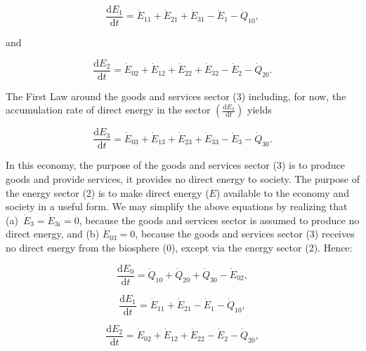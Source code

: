 \begin{equation} \label{eq:C-CV_E_dot_1}
	\frac{\mathrm{d}E_{1}}{\mathrm{d}t}
	= \dot{E}_{11}
	+ \dot{E}_{21}  
	+ \dot{E}_{31} 
	- \dot{E}_{1}
	- \dot{Q}_{10},
\end{equation}

\noindent and 

\begin{equation} \label{eq:C-CV_E_dot_2}
	\frac{\mathrm{d}E_{2}}{\mathrm{d}t} 	 
	= \dot{E}_{02} 
	+ \dot{E}_{12}
	+ \dot{E}_{22} 
	+ \dot{E}_{32} 
	- \dot{E}_{2} 
	- \dot{Q}_{20}.
\end{equation}

The First Law around the goods and services sector (3) including, 
for now, the accumulation rate of direct energy in the sector 
$\left(\frac{\mathrm{d}E_{3}}{\mathrm{d}t}\right)$ yields

\begin{equation} \label{eq:C-CV_E_dot_3}
	\frac{\mathrm{d}E_{3}}{\mathrm{d}t} 
	= \dot{E}_{03} 
	+ \dot{E}_{13}
	+ \dot{E}_{23} 
	+ \dot{E}_{33} 
	- \dot{E}_3 
	- \dot{Q}_{30}.
\end{equation}

In this economy, the purpose of the goods and services sector (3) 
is to produce goods and provide services, 
it provides no direct energy to society. 
The purpose of the energy sector (2) is to make direct energy ($\dot{E}$) 
available to the economy and society in a useful form.
We may simplify the above equations
by realizing that (a)~$\dot{E}_{3} = \dot{E}_{3i} = 0$, 
because the goods and services sector 
is assumed to produce no direct energy, 
and (b) $\dot{E}_{03} = 0$, 
because the goods and services sector (3) 
receives no direct energy from the biosphere (0), 
except via the energy sector (2).
Hence:

\begin{equation} \label{eq:C-CV_E_dot_0_simp}
	\frac{\mathrm{d}E_{0}}{\mathrm{d}t} 	 
	= \dot{Q}_{10} 
	+ \dot{Q}_{20} 
	+ \dot{Q}_{30} 
	- \dot{E}_{02},
\end{equation}

\begin{equation} \label{eq:C-CV_E_dot_1_simp}
	\frac{\mathrm{d}E_{1}}{\mathrm{d}t}
	= \dot{E}_{11}
	+ \dot{E}_{21}
	- \dot{E}_{1}
	- \dot{Q}_{10},
\end{equation}

\begin{equation} \label{eq:C-CV_E_dot_2_simp}
	\frac{\mathrm{d}E_{2}}{\mathrm{d}t} 	 
	= \dot{E}_{02} 
	+ \dot{E}_{12}
	+ \dot{E}_{22} 
	- \dot{E}_{2} 
	- \dot{Q}_{20},
\end{equation}


